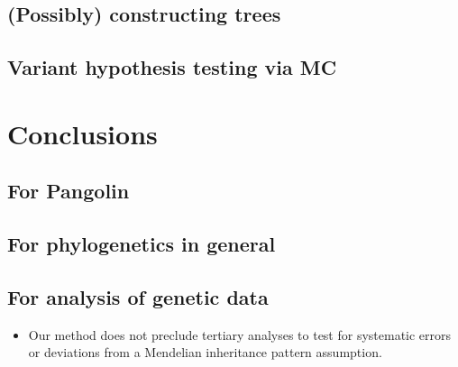 \documentclass[]{article}
\providecommand{\tightlist}{%
  \setlength{\itemsep}{0pt}\setlength{\parskip}{0pt}}
\begin{document}
\hypertarget{possibly-constructing-trees}{%
\subsection{(Possibly) constructing
trees}\label{possibly-constructing-trees}}

\hypertarget{variant-hypothesis-testing-via-mc}{%
\subsection{Variant hypothesis testing via
MC}\label{variant-hypothesis-testing-via-mc}}

\hypertarget{conclusions}{%
\section{Conclusions}\label{conclusions}}

\hypertarget{for-pangolin}{%
\subsection{For Pangolin}\label{for-pangolin}}

\hypertarget{for-phylogenetics-in-general}{%
\subsection{For phylogenetics in
general}\label{for-phylogenetics-in-general}}

\hypertarget{for-analysis-of-genetic-data}{%
\subsection{For analysis of genetic
data}\label{for-analysis-of-genetic-data}}

\begin{itemize}
\tightlist
\item
  Our method does not preclude tertiary analyses to test for systematic
  errors or deviations from a Mendelian inheritance pattern assumption.
\end{itemize}


\end{document}
